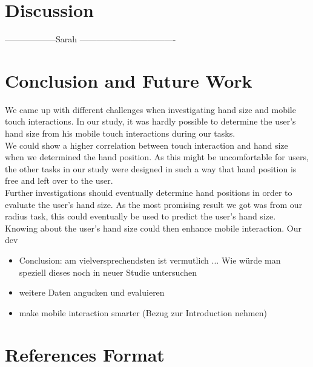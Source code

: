 \documentclass{sigchi}
\begin{document}
\section{Discussion}

------------------Sarah ----------------------------------
\section{Conclusion and Future Work}
We came up with different challenges when investigating hand size and mobile touch interactions. In our study, it was hardly possible to determine the user's hand size from his mobile touch interactions during our tasks.\\
We could show a higher correlation between touch interaction and hand size when we determined the hand position. As this might be uncomfortable for users, the other tasks in our study were designed in such a way that hand position is free and left over to the user.\\
Further investigations should eventually determine hand positions in order to evaluate the user's hand size. As the most promising result we got was from our radius task, this could eventually be used to predict the user's hand size. Knowing about the user's hand size could then enhance mobile interaction. Our dev


\begin{itemize}
\item Conclusion: am vielversprechendsten ist vermutlich ... Wie würde man speziell dieses noch in neuer Studie untersuchen
\item weitere Daten angucken und evaluieren
\item make mobile interaction smarter (Bezug zur Introduction nehmen)
\end{itemize}



%
%
%
%
%
\balance{}

\section{References Format}




\balance{}



\end{document}

